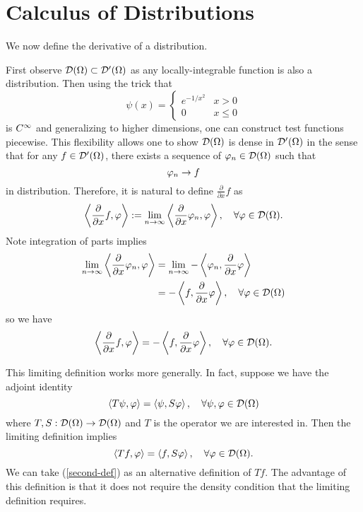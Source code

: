 \section{Calculus of Distributions}
We now define the derivative of a distribution.

First observe ${\mathcal D}(\Omega) \subset {\mathcal D}'(\Omega)$ as any locally-integrable function is also a distribution.
Then using the trick that
\[
    \psi(x) =
    \begin{cases}
        e^{-1/x^2}                                                      & x > 0 \\
        0                                                               & x \le 0
    \end{cases}
\]
is $C^\infty$ and generalizing to higher dimensions, one can construct test functions piecewise. This flexibility allows one to show ${\mathcal D}(\Omega)$ is dense in ${\mathcal D}'(\Omega)$ in the sense that for any $f \in {\mathcal D}'(\Omega)$, there exists a sequence of $\varphi_n \in {\mathcal D}(\Omega)$ such that
\[
    \varphi_n \to f
\]
in distribution. Therefore, it is natural to define $\frac{\partial}{\partial x}f$ as
\[
        \left\langle \frac{\partial}{\partial x}f, \varphi \right\rangle := \lim_{n \to \infty} \left\langle \frac{\partial}{\partial x}\varphi_n, \varphi \right\rangle, \quad \forall \varphi \in {\mathcal D}(\Omega).
\]
Note integration of parts implies
\[
    \begin{split}
        \lim_{n \to \infty} \left\langle \frac{\partial}{\partial x}\varphi_n, \varphi \right\rangle & = \lim_{n \to \infty} -\left\langle \varphi_n, \frac{\partial}{\partial x}\varphi \right\rangle\\
                                                                                           & = -\left\langle f, \frac{\partial}{\partial x}\varphi \right\rangle, \quad \forall \varphi \in {\mathcal D}(\Omega)
    \end{split}
\]
so we have
\[
        \left\langle \frac{\partial}{\partial x}f, \varphi \right\rangle = -\left\langle f, \frac{\partial}{\partial x}\varphi \right\rangle, \quad \forall \varphi \in {\mathcal D}(\Omega).
\]

This limiting definition works more generally. In fact, suppose we have the adjoint identity
\[
    \left\langle T\psi, \varphi \right\rangle = \left\langle \psi, S\varphi \right\rangle, \quad \forall \psi, \varphi \in {\mathcal D}(\Omega)
\]
where $T, S: {\mathcal D}(\Omega) \to {\mathcal D}(\Omega)$ and $T$ is the operator we are interested in. Then the limiting definition implies
\begin{equation}
    \label{second-def}
    \left\langle Tf, \varphi \right\rangle = \left\langle f, S\varphi \right\rangle, \quad \forall \varphi \in {\mathcal D}(\Omega).
\end{equation}
We can take (\ref{second-def}) as an alternative definition of $Tf$. The advantage of this definition is that it does not require the density condition that the limiting definition requires.

